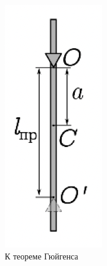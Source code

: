 \documentclass[a4paper,12pt]{article} %
\begin{document}
\begin{figure} 
\vspace{-5ex}
\includegraphics[width=\linewidth]{Маятник2}
\caption{К теореме Гюйгенса}
\label{fig:somelabel}
\end{figure}
\end{document}
